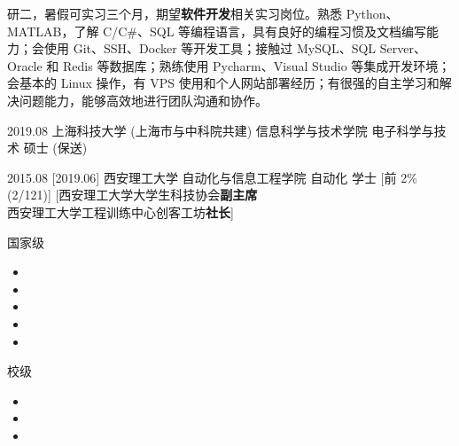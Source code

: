 \documentclass[zh]{resume}
\begin{document}
\makeheader

{\onehalfspacing\hspace{2em}%
    研二，暑假可实习三个月，期望\textbf{软件开发}相关实习岗位。熟悉 Python、MATLAB，了解 C/C\#、SQL 等编程语言，具有良好的编程习惯及文档编写能力；会使用 Git、SSH、Docker 等开发工具；接触过 MySQL、SQL Server、Oracle 和 Redis 等数据库；熟练使用 Pycharm、Visual Studio 等集成开发环境；会基本的 Linux 操作，有 VPS 使用和个人网站部署经历；有很强的自主学习和解决问题能力，能够高效地进行团队沟通和协作。
    \par}

\begin{educations}
    \education%
    {2019.08}%
    {上海科技大学 (上海市与中科院共建) }%
    {信息科学与技术学院}%
    {电子科学与技术}%
    {硕士 (保送)}

    \separator{0.5ex}
    \education%
    {2015.08}%
    [2019.06]%
    {西安理工大学}%
    {自动化与信息工程学院}%
    {自动化}%
    {学士}
    [前 2\% (2/121)]
    [西安理工大学大学生科技协会\textbf{副主席}\\
    西安理工大学工程训练中心创客工坊\textbf{社长}]
\end{educations}

\begin{awards}
    \award
    {国家级}
    {
        \begin{itemize}
            \item {}
            \item {}
            \item {}
            \item {}
            \item {}
        \end{itemize}
    }
    \separator{0.5ex}
    \award
    {校级}
    {
        \begin{itemize}
            \item {}
            \item {}
            \item {}
        \end{itemize}
    }
\end{awards}
\end{document}
